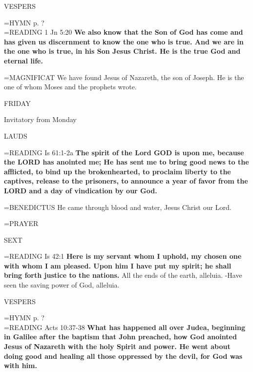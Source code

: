 \begin{flushleft}\normalsize VESPERS\\\end{flushleft}
\hangindent=\parindent \small{\uppercase{HYMN} p.  ?\\}
\hangindent=\parindent \small{READING}    1 Jn 5:20 \textbf{   We also know that the Son of God has come and has given us discernment to know the one who is true. And we are in the one who is true, in his Son Jesus Christ. He is the true God and eternal life.\\}

\hangindent=\parindent \small{MAGNIFICAT 	We have found Jesus of Nazareth, the son of Joseph. He is the one of whom Moses and the prophets wrote.\\}

\begin{center}
\normalsize FRIDAY
\end{center}

Invitatory from Monday
\begin{flushleft}\normalsize LAUDS\\\end{flushleft}
\hangindent=\parindent \small{READING}    Is 61:1-2a \textbf{   The spirit of the Lord GOD is upon me, because the LORD has anointed me; He has sent me to bring good news to the afflicted, to bind up the brokenhearted, to proclaim liberty to the captives, release to the prisoners, to announce a year of favor from the LORD and a day of vindication by our God.\\}

\hangindent=\parindent \small{BENEDICTUS 	He came through blood and water, Jesus Christ our Lord.\\}

\hangindent=\parindent \small{PRAYER 	}

\begin{flushleft}\normalsize SEXT\\\end{flushleft}
\hangindent=\parindent \small{READING}    Is 42:1 \textbf{   Here is my servant whom I uphold, my chosen one with whom I am pleased. Upon him I have put my spirit; he shall bring forth justice to the nations.}
All the ends of the earth, alleluia.
-Have seen the saving power of God, alleluia.

\begin{flushleft}\normalsize VESPERS\\\end{flushleft}
\hangindent=\parindent \small{\uppercase{HYMN} p.  ?\\}
\hangindent=\parindent \small{READING}    Acts 10:37-38 \textbf{   What has happened all over Judea, beginning in Galilee after the baptism that John preached, how God anointed Jesus of Nazareth with the holy Spirit and power. He went about doing good and healing all those oppressed by the devil, for God was with him.\\}

